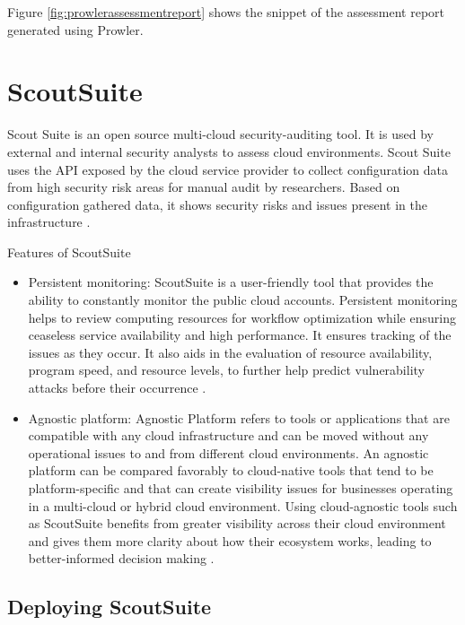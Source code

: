 Figure \ref{fig:prowlerassessmentreport} shows the snippet of the assessment report generated using Prowler.


\hfill \break
\section{ScoutSuite}

\par Scout Suite is an open source multi-cloud security-auditing tool.
It is used by external and internal security analysts to assess cloud environments.
Scout Suite  uses the API exposed by the cloud service provider to collect configuration data from high security risk areas for manual audit by researchers.
Based on configuration gathered data, it shows security risks and issues present in the infrastructure \cite{72}.
\hfill \break
\par Features of ScoutSuite
\begin{itemize}
    \item Persistent monitoring: ScoutSuite is a user-friendly tool that provides the ability to constantly monitor
    the public cloud accounts.
    Persistent monitoring helps to review computing resources for workflow optimization while ensuring ceaseless service availability and high performance.
    It ensures tracking of the issues as they occur.
    It also aids in the evaluation of resource availability, program speed, and resource levels, to further help predict vulnerability attacks before their occurrence \cite{73}.
\end{itemize}
\begin{itemize}
    \item Agnostic platform: Agnostic Platform refers to tools or applications that are compatible with any cloud
    infrastructure and can be moved without any operational issues to and from different cloud environments.
    An agnostic platform can be compared favorably to cloud-native tools that tend to be platform-specific and that can create visibility issues for businesses operating in a multi-cloud or hybrid cloud environment.
    Using cloud-agnostic tools such as ScoutSuite benefits from greater visibility across their cloud environment and gives them more clarity about how their ecosystem works, leading to better-informed decision making \cite{73}.
\end{itemize}


\hfill \break

\subsection{Deploying ScoutSuite}

